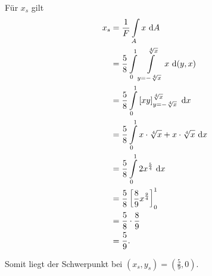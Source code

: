 \documentclass[main.tex]{subfiles}
\begin{document}
Für $x_s$ gilt
\begin{align*}
    x_s &= \frac{1}{F} \int \limits_A x ~\mathrm{d}A \\
        &= \frac{5}{8} \int \limits_{0}^{1} \int \limits_{y=-\sqrt[4]{x}}^{\sqrt[4]{x}} x ~\mathrm{d}(y,x) \\
        &= \frac{5}{8} \int \limits_{0}^{1} \left[ xy \right]_{y=-\sqrt[4]{x}}^{\sqrt[4]{x}} ~\mathrm{d}x \\
        &= \frac{5}{8} \int \limits_{0}^{1} x\cdot \sqrt[4]{x} + x\cdot \sqrt[4]{x} ~\mathrm{d}x \\
        &= \frac{5}{8} \int \limits_{0}^{1} 2 {x}^{\frac{5}{4}} ~\mathrm{d}x \\
        &= \frac{5}{8} \left[ \frac{8}{9} {x}^{\frac{9}{4}} \right]_{0}^{1} \\
        &= \frac{5}{8} \cdot \frac{8}{9}  \\
        &= \frac{5}{9}. \\
\end{align*}

Somit liegt der Schwerpunkt bei $(x_s, y_s) = \left(\frac{5}{9}, 0\right)$.
\end{document}

